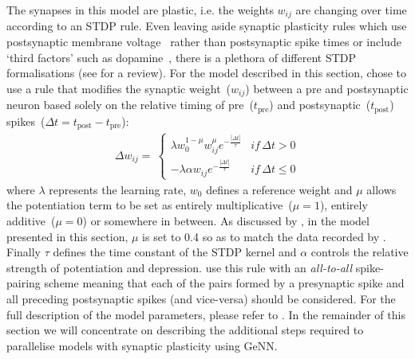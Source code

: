 \documentclass[utf8]{frontiersSCNS} %
\begin{document}
The synapses in this model are plastic, i.e. the weights $w_{ij}$ are changing over time according to an STDP rule.
Even leaving aside synaptic plasticity rules which use postsynaptic membrane voltage~\citep{Brader2007,Clopath2010c} rather than postsynaptic spike times or include `third factors' such as dopamine~\citep{Izhikevich2007}, there is a plethora of different STDP formalisations (see \citet{Morrison2008} for a review).
For the model described in this section, \citet{Morrison2007} chose to use a rule that modifies the synaptic weight~($w_{ij}$) between a pre and postsynaptic neuron based solely on the relative timing of pre~($t_{\text{pre}}$) and postsynaptic~($t_{\text{post}}$) spikes~($\Delta t = t_{\text{post}} - t_{\text{pre}}$):
%
\begin{align}
    \Delta w_{ij} = \
        \begin{cases}
            \lambda w_{0}^{1-\mu} w_{ij}^{\mu} e^{-\frac{|\Delta t|}{\tau}} & if\, \Delta t>0\\
            -\lambda \alpha w_{ij} e^{-\frac{|\Delta t|}{\tau}}             & if\, \Delta t\leq0
        \end{cases}\label{eq:mad_stdp}
\end{align}
%
where $\lambda$ represents the learning rate, $w_{0}$ defines a reference weight and $\mu$ allows the potentiation term to be set as entirely multiplicative~($\mu=1$), entirely additive~($\mu=0$) or somewhere in between.
As discussed by \citet{Morrison2007}, in the model presented in this section, $\mu$ is set to \num{0.4} so as to match the data recorded by \citet{Bi1998}.
Finally $\tau$ defines the time constant of the STDP kernel and $\alpha$ controls the relative strength of potentiation and depression.
\citeauthor{Morrison2007} use this rule with an \textit{all-to-all} spike-pairing scheme meaning that each of the pairs formed by a presynaptic spike and all preceding postsynaptic spikes (and vice-versa) should be considered.
For the full description of the model parameters, please refer to \citet[sections 3 and 4.1]{Morrison2007}.
In the remainder of this section we will concentrate on describing the additional steps required to parallelise models with synaptic plasticity using GeNN.
\end{document}
